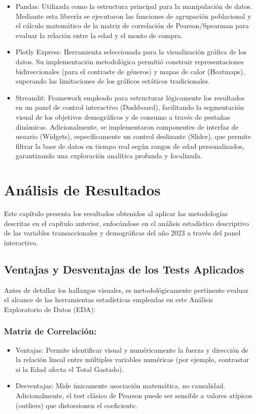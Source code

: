 \documentclass[oneside,11pt]{Latex/Classes/PhDthesisPSnPDF}
\begin{document}
\begin{itemize}
\item{Pandas: Utilizada como la estructura principal para la manipulación de datos. Mediante esta librería se ejecutaron las funciones de agrupación poblacional y el cálculo matemático de la matriz de correlación de Pearson/Spearman para evaluar la relación entre la edad y el monto de compra.}

\item{Plotly Express: Herramienta seleccionada para la visualización gráfica de los datos. Su implementación metodológica permitió construir representaciones bidireccionales (para el contraste de géneros) y mapas de calor (Heatmaps), superando las limitaciones de los gráficos estáticos tradicionales.}

\item{Streamlit: Framework empleado para estructurar lógicamente los resultados en un panel de control interactivo (Dashboard), facilitando la segmentación visual de los objetivos demográficos y de consumo a través de pestañas dinámicas. Adicionalmente, se implementaron componentes de interfaz de usuario (Widgets), específicamente un control deslizante (Slider), que permite filtrar la base de datos en tiempo real según rangos de edad personalizados, garantizando una exploración analítica profunda y focalizada.}
\end{itemize}

\chapter{Análisis de Resultados}

Este capítulo presenta los resultados obtenidos al aplicar las
metodologías descritas en el capítulo anterior, enfocándose en el
análisis estadístico descriptivo de las variables transaccionales y
demográficas del año 2023 a través del panel interactivo.

\section{Ventajas y Desventajas de los Tests Aplicados}

Antes de detallar los hallazgos visuales, es metodológicamente
pertinente evaluar el alcance de las herramientas estadísticas empleadas
en este Análisis Exploratorio de Datos (EDA):

\subsection{Matriz de Correlación:}
\begin{itemize}
\item{Ventajas: Permite identificar visual y numéricamente la fuerza y dirección de la relación lineal entre múltiples variables numéricas (por ejemplo, contrastar si la Edad afecta el Total Gastado).}

\item{Desventajas: Mide únicamente asociación matemática, no causalidad. Adicionalmente, el test clásico de Pearson puede ser sensible a valores atípicos (outliers) que distorsionen el coeficiente.}
\end{itemize}
\end{document}
